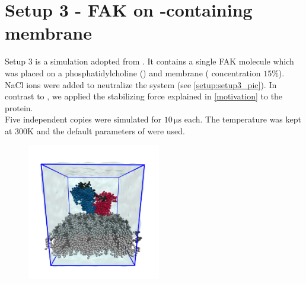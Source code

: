 \section{Setup 3 - FAK on \pip{}-containing membrane}
\label{setup:setup3}
Setup 3 is a \martini{} simulation adopted from \textcite{sara}. It contains a single FAK molecule which was placed on a phosphatidylcholine (\popc{}) and \pip{} membrane (\pip{} concentration $15\%$). NaCl ions were added to neutralize the system (see \autoref{setup:setup3_pic}). In contrast to \textcite{sara}, we applied the stabilizing force explained in \autoref{motivation} to the protein.\\
Five independent copies were simulated for $10\,\si{\micro\second}$ each. The temperature was kept at $300\si{\kelvin}$ and the default parameters of \martini{} were used.
%
%
%
\begin{figure}[h]
	\centering
	\includegraphics[height=6cm]{figures/setup/setup_gen}
	\label{setup:setup3_pic}
\end{figure}
%
%
%

